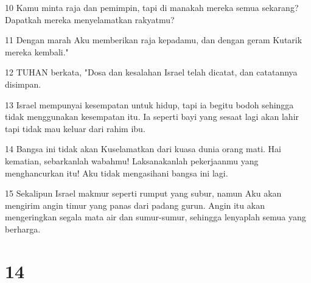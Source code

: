 \par 10 Kamu minta raja dan pemimpin, tapi di manakah mereka semua sekarang? Dapatkah mereka menyelamatkan rakyatmu?
\par 11 Dengan marah Aku memberikan raja kepadamu, dan dengan geram Kutarik mereka kembali."
\par 12 TUHAN berkata, "Dosa dan kesalahan Israel telah dicatat, dan catatannya disimpan.
\par 13 Israel mempunyai kesempatan untuk hidup, tapi ia begitu bodoh sehingga tidak menggunakan kesempatan itu. Ia seperti bayi yang sesaat lagi akan lahir tapi tidak mau keluar dari rahim ibu.
\par 14 Bangsa ini tidak akan Kuselamatkan dari kuasa dunia orang mati. Hai kematian, sebarkanlah wabahmu! Laksanakanlah pekerjaanmu yang menghancurkan itu! Aku tidak mengasihani bangsa ini lagi.
\par 15 Sekalipun Israel makmur seperti rumput yang subur, namun Aku akan mengirim angin timur yang panas dari padang gurun. Angin itu akan mengeringkan segala mata air dan sumur-sumur, sehingga lenyaplah semua yang berharga.

\chapter{14}

